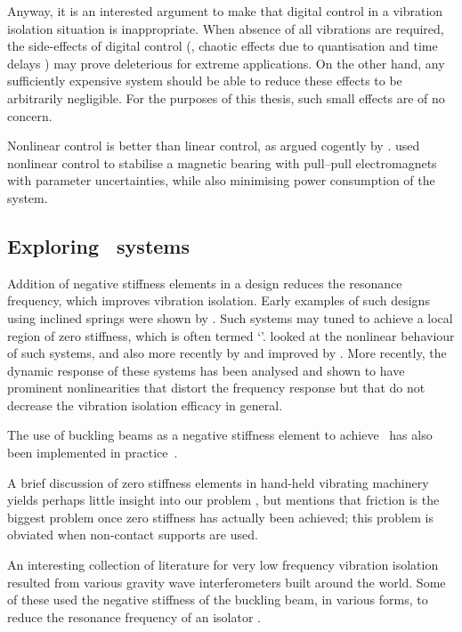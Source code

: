 \cite{zuo2004}

Anyway, it is an interested argument to make that digital control in a
vibration isolation situation is inappropriate. When absence of all
vibrations are required, the side-effects of digital control (\ie,
chaotic effects due to quantisation and time delays
\cite{csernak2007}) may prove deleterious for extreme applications. On
the other hand, any sufficiently expensive system should be able to
reduce these effects to be arbitrarily negligible. For the purposes of
this thesis, such small effects are of no concern.


Nonlinear control is better than linear control, as argued cogently by
\textcite{kokotovic1992}. \textcite{queiroz2007} used nonlinear
control to stabilise a magnetic bearing with pull--pull electromagnets
with parameter uncertainties, while also minimising power consumption
of the system.


\subsection{Exploring \qzs\ systems}

Addition of negative stiffness elements in a design reduces the resonance
frequency, which improves vibration isolation. Early examples of such designs
using inclined springs were shown by \textcite{molyneux1957}. Such systems may
tuned to achieve a local region of zero stiffness, which is often termed
`\qzs'. \textcite{alabuzhev1989} looked at the nonlinear behaviour of such
systems, and also more recently by
\textcite{carrella2006,carrella2007,carrella2008} and improved by
\textcite{kovacic2008}. More recently, the dynamic response of these systems
has been analysed \parencite{carrella2009,carrella2008thesis} and shown to
have prominent nonlinearities that distort the frequency response but that do
not decrease the vibration isolation efficacy in general.

The use of buckling beams as a negative stiffness element to achieve \qzs\ has
also been implemented in practice~\cite{platus1999,tarnai2003,lee2007}.

A brief discussion of zero stiffness elements in hand-held vibrating
machinery yields perhaps little insight into our problem
\cite{sokolov2007}, but mentions that friction is the biggest problem
once zero stiffness has actually been achieved; this problem is
obviated when non-contact supports are used.

An interesting collection of literature for very low frequency vibration
isolation resulted from various gravity wave interferometers built around the
world. Some of these used the negative stiffness of the buckling beam, in
various forms, to reduce the resonance frequency of an isolator
\cite{cella2005}.

